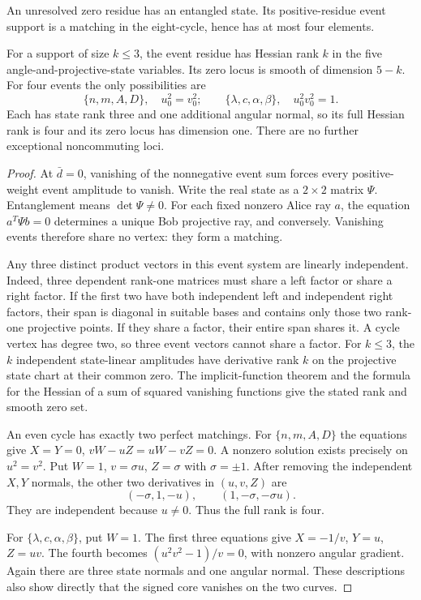 \begin{theorem}
An unresolved zero residue has an entangled state. Its positive-residue event support is a matching in the eight-cycle, hence has at most four elements.

For a support of size $k\le3$, the event residue has Hessian rank $k$ in the five angle-and-projective-state variables. Its zero locus is smooth of dimension $5-k$. For four events the only possibilities are
\[
\{n,m,A,D\},\quad u_0^2=v_0^2;
\qquad
\{\lambda,c,\alpha,\beta\},\quad u_0^2v_0^2=1.
\]
Each has state rank three and one additional angular normal, so its full Hessian rank is four and its zero locus has dimension one. There are no further exceptional noncommuting loci.
\end{theorem}
\begin{proof}
At $\bar d=0$, vanishing of the nonnegative event sum forces every positive-weight event amplitude to vanish. Write the real state as a $2\times2$ matrix $\Psi$. Entanglement means $\det\Psi\ne0$. For each fixed nonzero Alice ray $a$, the equation $a^T\Psi b=0$ determines a unique Bob projective ray, and conversely. Vanishing events therefore share no vertex: they form a matching.

Any three distinct product vectors in this event system are linearly independent. Indeed, three dependent rank-one matrices must share a left factor or share a right factor. If the first two have both independent left and independent right factors, their span is diagonal in suitable bases and contains only those two rank-one projective points. If they share a factor, their entire span shares it. A cycle vertex has degree two, so three event vectors cannot share a factor. For $k\le3$, the $k$ independent state-linear amplitudes have derivative rank $k$ on the projective state chart at their common zero. The implicit-function theorem and the formula for the Hessian of a sum of squared vanishing functions give the stated rank and smooth zero set.

An even cycle has exactly two perfect matchings. For $\{n,m,A,D\}$ the equations give $X=Y=0$, $vW-uZ=uW-vZ=0$. A nonzero solution exists precisely on $u^2=v^2$. Put $W=1$, $v=\sigma u$, $Z=\sigma$ with $\sigma=\pm1$. After removing the independent $X,Y$ normals, the other two derivatives in $(u,v,Z)$ are
\[
(-\sigma,1,-u),\qquad(1,-\sigma,-\sigma u).
\]
They are independent because $u\ne0$. Thus the full rank is four.

For $\{\lambda,c,\alpha,\beta\}$, put $W=1$. The first three equations give $X=-1/v$, $Y=u$, $Z=uv$. The fourth becomes $(u^2v^2-1)/v=0$, with nonzero angular gradient. Again there are three state normals and one angular normal. These descriptions also show directly that the signed core vanishes on the two curves.
\end{proof}

